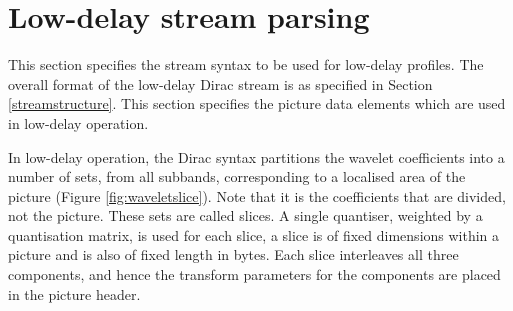 \begin{comment}
\section{Low-delay profiles}
\label{lowdelay}

The primary feature of the low-delay profile stream syntax is to group both wavelet coefficients and 
motion vectors into small chunks so that pictures may be decoded progressively. Both the wavelet
transform and motion compensation are specified exactly (i.e. in terms of operations over
the whole picture) as for the baseline profile, and the decoding process is equivalent to obtaining
all motion vectors and all wavelet coefficients for a picture and proceeding as specified in Sections
\ref{idwt} and \ref{mc}. 

However since all the data relating to small areas of the picture is presented together, both the wavelet
transform and motion compensation may be performed bit-by-bit as data arrives. Note that the data is
chunked into slices in the {\em compressed} domain, which may mean that a number of subsequent slices
may also need to be parsed in order to correctly decode the current slice -- due to long wavelet filters
and block overlaps.


\subsection{Dirac Link}
\label{diraclink}

\subsection{Dirac Wireless}
\label{diraclink}

\end{comment}

\section{Low-delay stream parsing}
\label{lowdelayparsing}

This section specifies the stream syntax to be used for low-delay profiles.
The overall format of the low-delay Dirac stream is as specified in Section \ref{streamstructure}. This section
specifies the picture data elements which are used in low-delay operation. 

In low-delay operation, the Dirac syntax partitions the wavelet coefficients into a number of sets,
from all subbands, corresponding to a localised area of the picture (Figure \ref{fig:waveletslice}).
 Note that it is the coefficients that are divided,
not the picture. These sets are called slices. A single quantiser, weighted by a quantisation matrix, is used for each slice, 
a slice is  of fixed dimensions within a picture and is also of fixed length in bytes. Each slice interleaves all three components, and hence
the transform parameters for the components are placed in the picture header.

